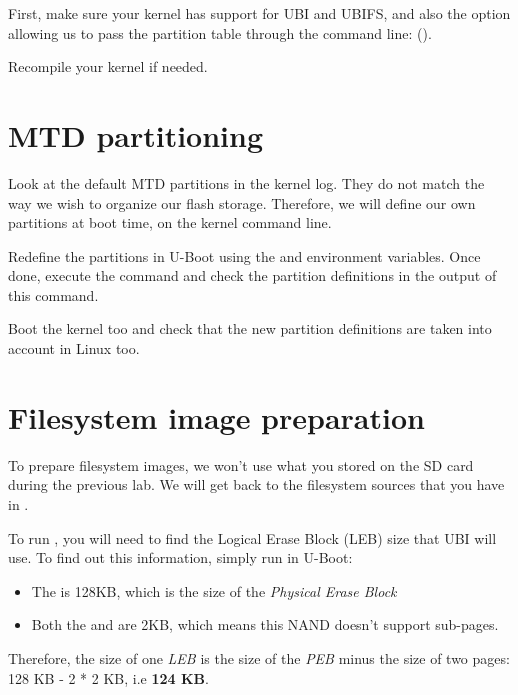 First, make sure your kernel has support for UBI and UBIFS, and also
the option allowing us to pass the partition table through the command
line:
().

Recompile your kernel if needed.

\section{MTD partitioning}

Look at the default MTD partitions in the kernel log. They do not
match the way we wish to organize our flash
storage. Therefore, we will define our own partitions at boot time,
on the kernel command line.

Redefine the partitions in U-Boot using the  and
 environment variables.
Once done, execute the  command and check the partition
definitions in the output of this command.

Boot the kernel too and check that the new partition definitions
are taken into account in Linux too.

\section{Filesystem image preparation}

To prepare filesystem images, we won't use what you stored on the SD
card during the previous lab. We will get back to the filesystem sources
that you have in .

To run , you will need to find the Logical Erase
Block (LEB) size that UBI will use. To find out this information,
simply run  in U-Boot:

\begin{itemize}

\item The  is 128KB, which is the size of the {\em
    Physical Erase Block}

\item Both the  and  are 2KB, which
  means this NAND doesn't support sub-pages.

\end{itemize}

Therefore, the size of one {\em LEB} is the size of the {\em PEB}
minus the size of two pages: 128 KB - 2 * 2 KB, i.e {\bf 124 KB}.


